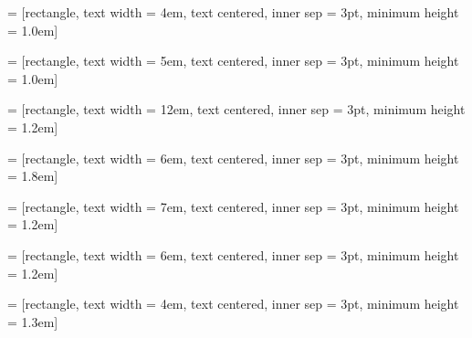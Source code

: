 \documentclass{article}
\begin{document}
 = [rectangle, text width = 4em, text centered, inner sep = 3pt, minimum height = 1.0em]

 = [rectangle, text width = 5em, text centered, inner sep = 3pt, minimum height = 1.0em]

 = [rectangle, text width = 12em, text centered, inner sep = 3pt, minimum height = 1.2em]

 = [rectangle, text width = 6em, text centered, inner sep = 3pt, minimum height = 1.8em]

 = [rectangle, text width = 7em, text centered, inner sep = 3pt, minimum height = 1.2em]

 = [rectangle, text width = 6em, text centered, inner sep = 3pt, minimum height = 1.2em]

 = [rectangle, text width = 4em, text centered, inner sep = 3pt, minimum height = 1.3em]
\end{document}
